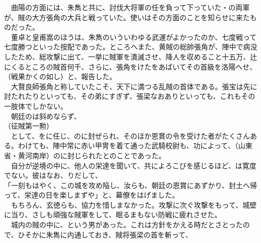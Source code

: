 \documentclass[
  paper=a5,
  fontsize=10pt,
  jafontsize=9.5pt,
  tate,                  %
  open_bracket_pos=nibu, %
]{jlreq}
\begin{document}
　曲陽の方面には、朱雋と共に、討伐大将軍の任を負って下っていた・の両軍が、賊の大方張角の大兵と戦っていた。使いはその方面のことを知らせに来たものだった。\\


　董卓と皇甫嵩のほうは、朱雋のいういわゆる武運がよかったのか、七度戦って七度勝つといった按配であった。ところへまた、黄賊の総帥張角が、陣中で病没したため、総攻撃に出て、一挙に賊軍を潰滅させ、降人を収めること十五万、辻にくるところの賊首何千、さらに、張角をけたをあばいてその首級を洛陽へせ、\\


（戦果かくの如し）と、報告した。\\


　大賢良師張角と称していたこそ、天下に満つる乱賊の首体である。張宝は先に討たれたりといっても、その弟にすぎず、張梁なおありといっても、これもその一肢体でしかない。\\


　朝廷のは斜めならず、\\


（征賊第一勲）\\


　として、をに任じ、のに封ぜられ、そのほか恩賞の令を受けた者がたくさんある。わけても、陣中常に赤い甲冑を着て通った武騎校尉も、功によって、（山東省・黄河南岸）のに封じられたとのことであった。\\


　自分が逆境の中に、他人の栄達を聞いて、共によろこびを感じるほど、は寛度でない。彼はなお、りだして、\\


「一刻もはやく、この城を攻め陥し、汝らも、朝廷の恩賞にあずかり、封土へ帰って、栄達の日を楽しまずや」と、幕僚をはげました。\\


　もちろん、玄徳らも、協力を惜しまなかった。攻撃に次ぐ攻撃をもって、城壁に当り、さしも頑強な賊軍をして、眠るまもない防戦に疲れさせた。\\


　城内の賊の中に、という男があった。これは方針をかえる時だとさとったので、ひそかに朱雋に内通しておき、賊将張梁の首を斬って、\\
\end{document}
